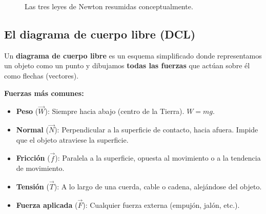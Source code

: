 \documentclass[12pt, a4paper]{article}
\begin{document}
\begin{figure}[h!]
  \caption{Las tres leyes de Newton resumidas conceptualmente.}
  \label{fig:newton}
\end{figure}

\subsection{El diagrama de cuerpo libre (DCL)}

Un \textbf{diagrama de cuerpo libre} es un esquema simplificado donde representamos un objeto como un punto y dibujamos \textbf{todas las fuerzas} que actúan sobre él como flechas (vectores).

\begin{cuadrosolucion}
\textbf{Fuerzas más comunes:}
\begin{itemize}[leftmargin=*]
  \item \textbf{Peso} ($\vec{W}$): Siempre hacia abajo (centro de la Tierra). $W = mg$.
  \item \textbf{Normal} ($\vec{N}$): Perpendicular a la superficie de contacto, hacia afuera. Impide que el objeto atraviese la superficie.
  \item \textbf{Fricción} ($\vec{f}$): Paralela a la superficie, opuesta al movimiento o a la tendencia de movimiento.
  \item \textbf{Tensión} ($\vec{T}$): A lo largo de una cuerda, cable o cadena, alejándose del objeto.
  \item \textbf{Fuerza aplicada} ($\vec{F}$): Cualquier fuerza externa (empujón, jalón, etc.).
\end{itemize}
\end{cuadrosolucion}
\end{document}
